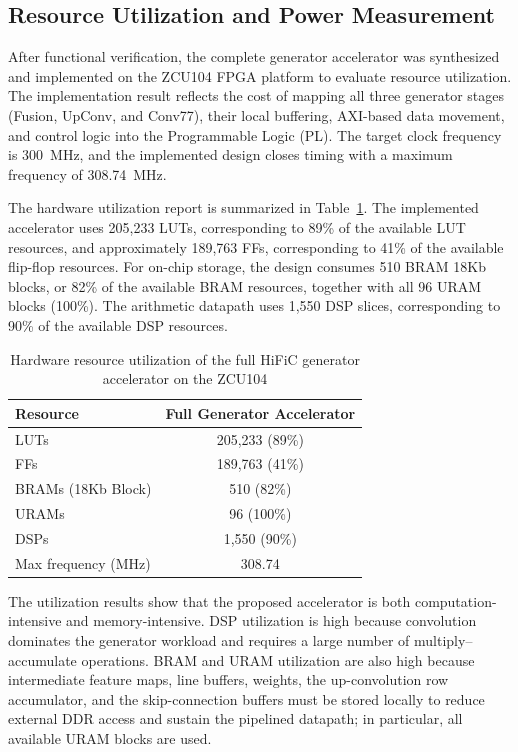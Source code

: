 \subsection{Resource Utilization and Power Measurement}

After functional verification, the complete generator accelerator was synthesized and implemented on the ZCU104 FPGA platform to evaluate resource utilization. The implementation result reflects the cost of mapping all three generator stages (Fusion, UpConv, and Conv77), their local buffering, AXI-based data movement, and control logic into the Programmable Logic (PL). The target clock frequency is 300~MHz, and the implemented design closes timing with a maximum frequency of 308.74~MHz.

The hardware utilization report is summarized in Table~\ref{tab:hific_generator_utilization}. The implemented accelerator uses 205,233 LUTs, corresponding to 89\% of the available LUT resources, and approximately 189,763 FFs, corresponding to 41\% of the available flip-flop resources. For on-chip storage, the design consumes 510 BRAM 18Kb blocks, or 82\% of the available BRAM resources, together with all 96 URAM blocks (100\%). The arithmetic datapath uses 1,550 DSP slices, corresponding to 90\% of the available DSP resources.

\begin{table}[H]
    \centering
    \caption{Hardware resource utilization of the full HiFiC generator accelerator on the ZCU104}
    \label{tab:hific_generator_utilization}
    \begin{tabular}{|l|c|}
        \hline
        \textbf{Resource} & \textbf{Full Generator Accelerator} \\
        \hline
        LUTs & 205,233 (89\%) \\
        \hline
        FFs & 189,763 (41\%) \\
        \hline
        BRAMs (18Kb Block) & 510 (82\%) \\
        \hline
        URAMs & 96 (100\%) \\
        \hline
        DSPs & 1,550 (90\%) \\
        \hline
        Max frequency (MHz) & 308.74 \\
        \hline
    \end{tabular}
\end{table}

The utilization results show that the proposed accelerator is both computation-intensive and memory-intensive. DSP utilization is high because convolution dominates the generator workload and requires a large number of multiply--accumulate operations. BRAM and URAM utilization are also high because intermediate feature maps, line buffers, weights, the up-convolution row accumulator, and the skip-connection buffers must be stored locally to reduce external DDR access and sustain the pipelined datapath; in particular, all available URAM blocks are used.

